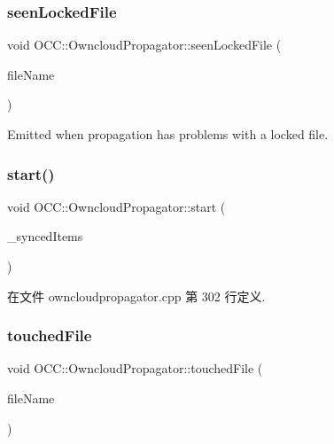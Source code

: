 \mbox{\label{class_o_c_c_1_1_owncloud_propagator_ac5efffe29f914985d15d7724a02ea4dd}} 
\subsubsection{\texorpdfstring{seen\+Locked\+File}{seenLockedFile}}
{\footnotesize\ttfamily void O\+C\+C\+::\+Owncloud\+Propagator\+::seen\+Locked\+File (\begin{DoxyParamCaption}\item[{const Q\+String \&}]{file\+Name }\end{DoxyParamCaption})\hspace{0.3cm}{\ttfamily [signal]}}

Emitted when propagation has problems with a locked file. \mbox{\label{class_o_c_c_1_1_owncloud_propagator_ab5d32d3f9452e6ff1aafd3e2868a5fa6}} 
\subsubsection{\texorpdfstring{start()}{start()}}
{\footnotesize\ttfamily void O\+C\+C\+::\+Owncloud\+Propagator\+::start (\begin{DoxyParamCaption}\item[{const \hyperlink{namespace_o_c_c_af407f0fdf0476e0bfce478be3d0e441e}{Sync\+File\+Item\+Vector} \&}]{\+\_\+synced\+Items }\end{DoxyParamCaption})}



在文件 owncloudpropagator.\+cpp 第 302 行定义.

\mbox{\label{class_o_c_c_1_1_owncloud_propagator_a167aa8a8e70143acb11e5eeebe7c8036}} 
\subsubsection{\texorpdfstring{touched\+File}{touchedFile}}
{\footnotesize\ttfamily void O\+C\+C\+::\+Owncloud\+Propagator\+::touched\+File (\begin{DoxyParamCaption}\item[{const Q\+String \&}]{file\+Name }\end{DoxyParamCaption})\hspace{0.3cm}{\ttfamily [signal]}}

